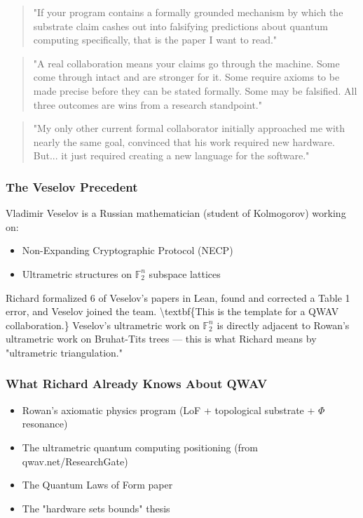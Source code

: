 \documentclass[11pt,a4paper]{article}
\begin{document}
\begin{quote}
"If your program contains a formally grounded mechanism by which the substrate claim cashes out into falsifying predictions about quantum computing specifically, that is the paper I want to read."
\end{quote}


\begin{quote}
"A real collaboration means your claims go through the machine. Some come through intact and are stronger for it. Some require axioms to be made precise before they can be stated formally. Some may be falsified. All three outcomes are wins from a research standpoint."
\end{quote}


\begin{quote}
"My only other current formal collaborator initially approached me with nearly the same goal, convinced that his work required new hardware. But... it just required creating a new language for the software."
\end{quote}


\subsubsection{The Veselov Precedent}


Vladimir Veselov is a Russian mathematician (student of Kolmogorov) working on:
\begin{itemize}
\item Non-Expanding Cryptographic Protocol (NECP)
\item Ultrametric structures on $\mathbb{F}_2^n$ subspace lattices
\end{itemize}


Richard formalized 6 of Veselov's papers in Lean, found and corrected a Table 1 error, and Veselov joined the team. \textbackslash{}textbf\{This is the template for a QWAV collaboration.\} Veselov's ultrametric work on $\mathbb{F}_2^n$ is directly adjacent to Rowan's ultrametric work on Bruhat-Tits trees  --- this is what Richard means by "ultrametric triangulation."

\subsubsection{What Richard Already Knows About QWAV}


\begin{itemize}
\item Rowan's axiomatic physics program (LoF + topological substrate + $\Phi$ resonance)
\item The ultrametric quantum computing positioning (from qwav.net/ResearchGate)
\item The Quantum Laws of Form paper
\item The "hardware sets bounds" thesis
\end{itemize}
\end{document}
